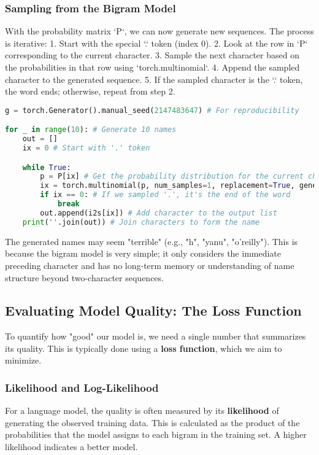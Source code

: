 \subsubsection{Sampling from the Bigram Model}
With the probability matrix `P`, we can now generate new sequences. The process is iterative:
1. Start with the special `.` token (index 0).
2. Look at the row in `P` corresponding to the current character.
3. Sample the next character based on the probabilities in that row using `torch.multinomial`.
4. Append the sampled character to the generated sequence.
5. If the sampled character is the `.` token, the word ends; otherwise, repeat from step 2.

\begin{lstlisting}[language=Python, caption=Sampling from the Bigram Model]
g = torch.Generator().manual_seed(2147483647) # For reproducibility

for _ in range(10): # Generate 10 names
    out = []
    ix = 0 # Start with '.' token

    while True:
        p = P[ix] # Get the probability distribution for the current character
        ix = torch.multinomial(p, num_samples=1, replacement=True, generator=g).item() # Sample next char
        if ix == 0: # If we sampled '.', it's the end of the word
            break
        out.append(i2s[ix]) # Add character to the output list
    print(''.join(out)) # Join characters to form the name
\end{lstlisting}

The generated names may seem "terrible" (e.g., "h", "yanu", "o'reilly"). This is because the bigram model is very simple; it only considers the immediate preceding character and has no long-term memory or understanding of name structure beyond two-character sequences.

\subsection{Evaluating Model Quality: The Loss Function}
To quantify how "good" our model is, we need a single number that summarizes its quality. This is typically done using a \textbf{loss function}, which we aim to minimize.

\subsubsection{Likelihood and Log-Likelihood}
For a language model, the quality is often measured by its \textbf{likelihood} of generating the observed training data. This is calculated as the product of the probabilities that the model assigns to each bigram in the training set. A higher likelihood indicates a better model.

